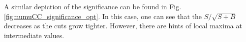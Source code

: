 A similar depiction of the significance can be found in Fig. \ref{fig:numuCC_significance_opt}. In this case, one can see that the $S/\sqrt{S+B}$ decreases as the cuts grow tighter. However, there are hints of local maxima at intermediate values.

